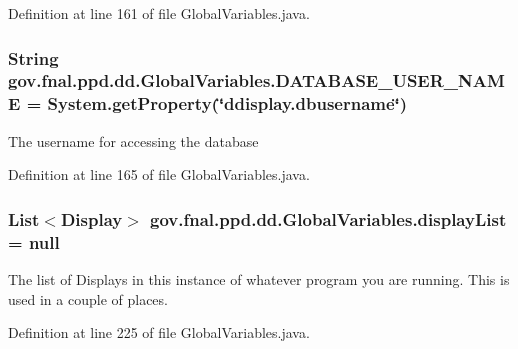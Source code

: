 Definition at line 161 of file Global\-Variables.\-java.

\hypertarget{classgov_1_1fnal_1_1ppd_1_1dd_1_1GlobalVariables_a1b5c1519d1964bf42b3fe4908ae6d444}{
\subsubsection[{D\-A\-T\-A\-B\-A\-S\-E\-\_\-\-U\-S\-E\-R\-\_\-\-N\-A\-M\-E}]{\setlength{\rightskip}{0pt plus 5cm}String gov.\-fnal.\-ppd.\-dd.\-Global\-Variables.\-D\-A\-T\-A\-B\-A\-S\-E\-\_\-\-U\-S\-E\-R\-\_\-\-N\-A\-M\-E = System.\-get\-Property(\char`\"{}ddisplay.\-dbusername\char`\"{})\hspace{0.3cm}{\ttfamily [static]}}}\label{classgov_1_1fnal_1_1ppd_1_1dd_1_1GlobalVariables_a1b5c1519d1964bf42b3fe4908ae6d444}
The username for accessing the database 

Definition at line 165 of file Global\-Variables.\-java.

\hypertarget{classgov_1_1fnal_1_1ppd_1_1dd_1_1GlobalVariables_a30efdc2ab60dd04f76dc1210b8447426}{
\subsubsection[{display\-List}]{\setlength{\rightskip}{0pt plus 5cm}List$<${\bf Display}$>$ gov.\-fnal.\-ppd.\-dd.\-Global\-Variables.\-display\-List = null\hspace{0.3cm}{\ttfamily [static]}}}\label{classgov_1_1fnal_1_1ppd_1_1dd_1_1GlobalVariables_a30efdc2ab60dd04f76dc1210b8447426}
The list of Displays in this instance of whatever program you are running. This is used in a couple of places. 

Definition at line 225 of file Global\-Variables.\-java.

